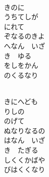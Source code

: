 \documentclass[10pt,b5j]{tarticle} %
\begin{document}
\vspace{1.5em} %
\newcommand{\linespace}{0.5em} %
\newcommand{\blocksize}{0.5\hsize} %
\newcommand{\itemmargin}{3em} %
\begin{enumerate} %
    \setlength{\itemindent}{\itemmargin} %
    \begin{minipage}[c]{\blocksize}
    
        \vspace{\linespace}
        \item~\\
        きのに\\
        うちてしが\\
        にれて\\
        ぞなるのきよ\\
        へなん　いざ\\
        き　ゆる\\
        をしをかん\\
        のくるなり
        
    \end{minipage}
    \begin{minipage}[c]{\blocksize}
        
        \vspace{\linespace}
        \item~\\
        きにへども\\
        りしの\\
        のげて\\
        ぬなりなるの\\
        はなん　いざ\\
        き　たぎる\\
        しくくかばや\\
        びはくくなり
        

\end{minipage}
\end{enumerate}
\end{document}
